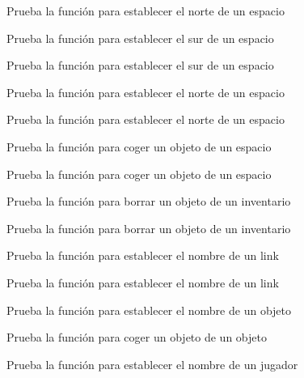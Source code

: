 \begin{DoxyRefList}
Prueba la función para establecer el norte de un espacio  
\item[\label{test__test000248}%
\Hypertarget{test__test000248}%
Member \hyperlink{space__test_8h_ac9f950741f12ccfcc5ad5d9e71d3d90a}{test2\+\_\+space\+\_\+set\+\_\+south} ()]Prueba la función para establecer el sur de un espacio 

Prueba la función para establecer el sur de un espacio  
\item[\label{test__test000252}%
\Hypertarget{test__test000252}%
Member \hyperlink{space__test_8h_aa51b05ffd99b7bbd8f2dfc23c8f85870}{test2\+\_\+space\+\_\+set\+\_\+west} ()]Prueba la función para establecer el norte de un espacio 

Prueba la función para establecer el norte de un espacio  
\item[\label{test__test000256}%
\Hypertarget{test__test000256}%
Member \hyperlink{space__test_8h_a7bc20aaf065fab5ce11288a0f1d3dfab}{test2\+\_\+space\+\_\+take\+\_\+object} ()]Prueba la función para coger un objeto de un espacio 

Prueba la función para coger un objeto de un espacio  
\item[\label{test__test000171}%
\Hypertarget{test__test000171}%
Member \hyperlink{inventory__test_8h_a66005d07626ca1dae670ddc7fc3a9514}{test3\+\_\+inventory\+\_\+delete\+\_\+object} ()]Prueba la función para borrar un objeto de un inventario 

Prueba la función para borrar un objeto de un inventario  
\item[\label{test__test000187}%
\Hypertarget{test__test000187}%
Member \hyperlink{link__test_8h_a8396e33f601deb52c940cb89cd7c6bfe}{test3\+\_\+link\+\_\+set\+\_\+name} ()]Prueba la función para establecer el nombre de un link 

Prueba la función para establecer el nombre de un link  
\item[\label{test__test000050}%
\Hypertarget{test__test000050}%
Member \hyperlink{object__test_8c_ab40669b5d083b6484197d917fb6882b1}{test3\+\_\+object\+\_\+set\+\_\+name} ()]Prueba la función para establecer el nombre de un objeto  
\item[\label{test__test000063}%
\Hypertarget{test__test000063}%
Member \hyperlink{object__test_8c_add7988c5f1529d05be42760049c5b554}{test3\+\_\+object\+\_\+take\+\_\+object} ()]Prueba la función para coger un objeto de un objeto  
\item[\label{test__test000208}%
\Hypertarget{test__test000208}%
Member \hyperlink{player__test_8h_a447ebbb4ba2206abeaf4b60200e312da}{test3\+\_\+player\+\_\+set\+\_\+name} ()]Prueba la función para establecer el nombre de un jugador 


\end{DoxyRefList}
